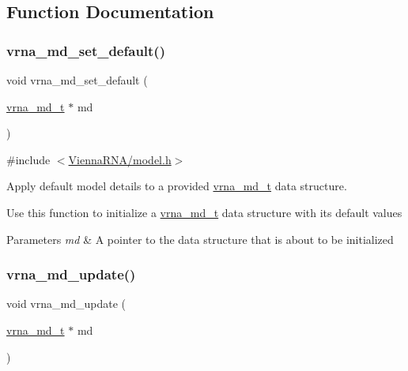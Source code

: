 \subsection{Function Documentation}
\mbox{\label{group__model__details_ga8ac6ff84936282436f822644bf841f66}} 
\subsubsection{\texorpdfstring{vrna\+\_\+md\+\_\+set\+\_\+default()}{vrna\_md\_set\_default()}}
{\footnotesize\ttfamily void vrna\+\_\+md\+\_\+set\+\_\+default (\begin{DoxyParamCaption}\item[{\hyperlink{group__model__details_ga1f8a10e12a0a1915f2a4eff0b28ea17c}{vrna\+\_\+md\+\_\+t} $\ast$}]{md }\end{DoxyParamCaption})}



{\ttfamily \#include $<$\hyperlink{model_8h}{Vienna\+R\+N\+A/model.\+h}$>$}



Apply default model details to a provided \hyperlink{group__model__details_ga1f8a10e12a0a1915f2a4eff0b28ea17c}{vrna\+\_\+md\+\_\+t} data structure. 

Use this function to initialize a \hyperlink{group__model__details_ga1f8a10e12a0a1915f2a4eff0b28ea17c}{vrna\+\_\+md\+\_\+t} data structure with its default values


\begin{DoxyParams}{Parameters}
{\em md} & A pointer to the data structure that is about to be initialized \\
\hline
\end{DoxyParams}
\mbox{\label{group__model__details_ga36ae40b8c3b82362f5798ad5b047b814}} 
\subsubsection{\texorpdfstring{vrna\+\_\+md\+\_\+update()}{vrna\_md\_update()}}
{\footnotesize\ttfamily void vrna\+\_\+md\+\_\+update (\begin{DoxyParamCaption}\item[{\hyperlink{group__model__details_ga1f8a10e12a0a1915f2a4eff0b28ea17c}{vrna\+\_\+md\+\_\+t} $\ast$}]{md }\end{DoxyParamCaption})}



